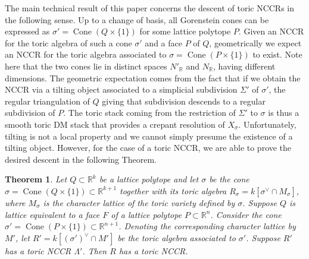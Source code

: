 \documentclass[reqno, 12pt]{amsart}
\newtheorem{theorem}{Theorem}[section]
\theoremstyle{definition}
\numberwithin{equation}{section}
\newcommand{\R}{\mathbb{R}}
\newcommand{\cone}{\operatorname{Cone}}
\begin{document}
The main technical result of this paper concerns the descent of toric NCCRs in the following sense. 
Up to a change of basis, all Gorenstein cones can be expressed as $\sigma'=\cone(Q\times\{1\})$ for some lattice polytope $P$. Given an NCCR for the toric algebra of such a cone $\sigma'$ and a face $P$ of $Q$, geometrically we expect an NCCR for the toric algebra associated to $\sigma=\cone(P\times\{1\})$ to exist. Note here that the two cones lie in distinct spaces $N'_\R$ and $N_\R$, having different dimensions. The geometric expectation comes from the fact that if we obtain the NCCR via a tilting object associated to a simplicial subdivision $\Sigma'$ of $\sigma'$, the regular triangulation of $Q$ giving that subdivision descends to a regular subdivision of $P$. The toric stack coming from the restriction of $\Sigma'$ to $\sigma$ is thus a smooth toric DM stack that provides a crepant resolution of $X_\sigma$. Unfortunately, tilting is not a local property and we cannot simply presume the existence of a tilting object. However, for the case of a toric NCCR, we are able to prove the desired descent in the following Theorem.
\begin{theorem}
    \label{Thm:FaceOfReflexiveTORICNCCR}
    Let $Q\subset \R^k$ be a lattice polytope and let $\sigma$ be the cone $\sigma=\cone(Q\times\{1\})\subset \R^{k+1}$ together with its toric algebra $R_\sigma=k[\sigma^\vee\cap M_\sigma]$, where $M_\sigma$ is the character lattice of the toric variety defined by $\sigma$. Suppose $Q$ is lattice equivalent to a face $F$ of a lattice polytope $P\subset \R^n$. Consider the cone $\sigma'=\cone(P\times\{1\})\subset\R^{n+1}$. Denoting the corresponding character lattice by $M'$, let $R'=k[(\sigma')^\vee\cap M']$ be the toric algebra associated to $\sigma'$. Suppose $R'$ has a toric NCCR $\Lambda'$. Then $R$ has a toric NCCR.
\end{theorem}
\end{document}
